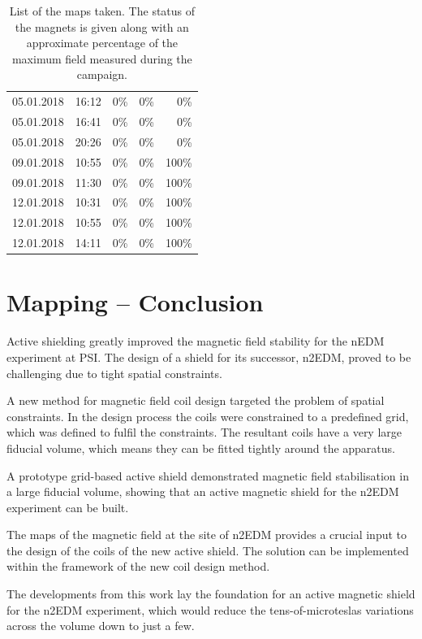\begin{table}
\begin{tabular}{ccrrr}
    05.01.2018  &  16:12  &  0\%      &  0\%    &  0\%    \\
    05.01.2018  &  16:41  &  0\%      &  0\%    &  0\%    \\
    05.01.2018  &  20:26  &  0\%      &  0\%    &  0\%    \\
    09.01.2018  &  10:55  &  0\%      &  0\%    &  100\%  \\
    09.01.2018  &  11:30  &  0\%      &  0\%    &  100\%  \\
    12.01.2018  &  10:31  &  0\%      &  0\%    &  100\%  \\
    12.01.2018  &  10:55  &  0\%      &  0\%    &  100\%  \\
    12.01.2018  &  14:11  &  0\%      &  0\%    &  100\%  \\
  \end{tabular}
  \caption{List of the maps taken.
  The status of the magnets is given along with an approximate percentage of the maximum field measured during the campaign.}\label{tab:psi_mapping_maps}
\end{table}




\section*{Mapping -- Conclusion}
Active shielding greatly improved the magnetic field stability for the nEDM experiment at PSI\@.
The design of a shield for its successor, n2EDM, proved to be challenging due to tight spatial constraints.

A new method for magnetic field coil design targeted the problem of spatial constraints.
In the design process the coils were constrained to a predefined grid, which was defined to fulfil the constraints.
The resultant coils have a very large fiducial volume, which means they can be fitted tightly around the apparatus.

A prototype grid-based active shield demonstrated magnetic field stabilisation in a large fiducial volume, showing that an active magnetic shield for the n2EDM experiment can be built.

The maps of the magnetic field at the site of n2EDM provides a crucial input to the design of the coils of the new active shield.
The solution can be implemented within the framework of the new coil design method.

The developments from this work lay the foundation for an active magnetic shield for the n2EDM experiment, which would reduce the tens-of-microteslas variations across the volume down to just a few.